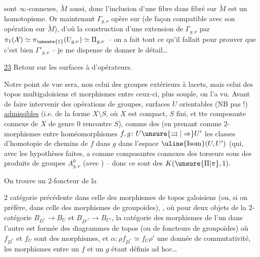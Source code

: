 sont $\infty$-connexes, $\widetilde M$ aussi, donc l'inclusion d'une fibre dans  fibré  sur $\widetilde M$ est un homotopisme. Or maintenant $\Gamma_{g,\nu}$ opère sur  (de façon compatible avec son opération sur $\widetilde M$), d'où la construction d'une extension de $\Gamma_{g,\nu}$ par $\pi_1(\mathcal X)\simeq\pi_{\unsure{1}}(U_{g,\nu})\simeq\Pi_{g,\nu}$ -- on a fait tout ce qu'il fallait pour prouver que c'est bien  $\Gamma'_{g,\nu}$ -- je me dispense de donner le détail\ldots

\uline{23} Retour sur les surfaces à  d'opérateurs.

Notre point de vue sera, non celui des groupes extérieurs à lacets, mais celui des topos multigaloisiens et morphismes entre ceux-ci, plus souple, on l'a vu.
Avant de faire intervenir des opérations de groupes,   surfaces $U$ orientables (NB pas  !)   \uline{admissibles} (i.e. de la forme $X\setminus S$, où $X$ est compact, $S$ fini, et tte composante connexe de $X$ de genre $0$ rencontre $S$), comme des  (en prenant comme $2$-morphismes entre  homéomorphismes $f,g\colon U\unsure{\rightrightarrows|\Rightarrow}U'$ les classes d'homotopie de chemins de $f$ dans $g$ dans l'espace $\uline{\mathrm{Isom}}(U,U')$ (qui, avec les hypothèses faites, a comme composantes connexes des  torseurs sous des produits de groupes $A_{g,\nu}^0$ (avec ) -- donc ce sont des $K(\unsure{\Pi|\pi},1)$.

On trouve un $2$-foncteur de la

$2$ catégorie précédente dans celle des morphismes de topos galoisiens (ou, si on préfère, dans celle des morphismes de groupoïdes), 
,
où pour deux objets de la $2$-catégorie $B_{D^*}\to B_U$ et $B_{D'^*}\to B_{U'}$, la catégorie des morphismes de l'un dans l'autre est formée des diagrammes    de topos (ou de foncteurs de groupoïdes)
où $f_{D^*}$ et $f_U$ sont des morphismes, et  $\alpha\colon\rho f_{D^*}\simeq f_U\rho'$ une donnée de commutativité,  les morphismes entre un $f$ et un $g$ étant définis ad hoc\ldots

